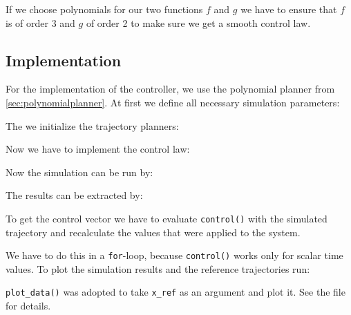 \documentclass[a4paper,11pt,headings=standardclasses,parskip=half]{scrartcl}
\newcommand{\listcode}[3]{}
\newcommand{\listcodeffcontrol}[2]{\listcode{#1}{#2}{../sim/02_car_feedforward_control.py}}
\begin{document}
If we choose polynomials for our two functions $f$ and $g$ we have to ensure that $f$ is of order 3 and $g$ of order 2 to make sure we get a smooth control law.
\subsection{Implementation}
For the implementation of the controller, we use the polynomial planner from \ref{sec:polynomialplanner}.
At first we define all necessary simulation parameters:
\listcodeffcontrol{21}{27}
The we initialize the trajectory planners:
\listcodeffcontrol{30}{45}
Now we have to implement the control law:
\listcodeffcontrol{70}{95}
Now the simulation can be run by:
\listcodeffcontrol{298}{298}
The results can be extracted by:
\listcodeffcontrol{299}{299}
To get the control vector we have to evaluate \texttt{control()} with the simulated trajectory and recalculate the values that were applied to the system. 
\listcodeffcontrol{300}{302}
We have to do this in a \texttt{for}-loop, because \texttt{control()} works only for scalar time values.
To plot the simulation results and the reference trajectories run:
\listcodeffcontrol{307}{318}
\texttt{plot\_data()} was adopted to take \texttt{x\_ref} as an argument and plot it. See the file for details.
\end{document}
